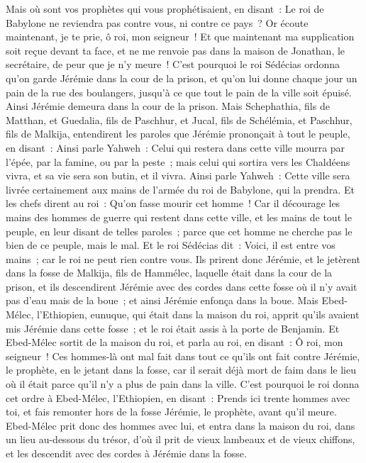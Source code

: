 \begin{multicols}{2}
Mais où sont vos prophètes qui vous prophétisaient, en disant~: Le roi de Babylone ne reviendra pas contre vous, ni contre ce pays~?
Or écoute maintenant, je te prie, ô roi, mon seigneur~! Et que maintenant ma supplication soit reçue devant ta face, et ne me renvoie pas dans la maison de Jonathan, le secrétaire, de peur que je n'y meure~!
C'est pourquoi le roi Sédécias ordonna qu'on garde Jérémie dans la cour de la prison, et qu'on lui donne chaque jour un pain de la rue des boulangers, jusqu'à ce que tout le pain de la ville soit épuisé. Ainsi Jérémie demeura dans la cour de la prison.
\VerseOne{}Mais Schephathia, fils de Matthan, et Guedalia, fils de Paschhur, et Jucal, fils de Schélémia, et Paschhur, fils de Malkija, entendirent les paroles que Jérémie prononçait à tout le peuple, en disant~:
Ainsi parle Yahweh~: Celui qui restera dans cette ville mourra par l'épée, par la famine, ou par la peste~; mais celui qui sortira vers les Chaldéens vivra, et sa vie sera son butin, et il vivra.
Ainsi parle Yahweh~: Cette ville sera livrée certainement aux mains de l'armée du roi de Babylone, qui la prendra.
Et les chefs dirent au roi~: Qu'on fasse mourir cet homme~! Car il décourage les mains des hommes de guerre qui restent dans cette ville, et les mains de tout le peuple, en leur disant de telles paroles~; parce que cet homme ne cherche pas le bien de ce peuple, mais le mal.
Et le roi Sédécias dit~: Voici, il est entre vos mains~; car le roi ne peut rien contre vous.
Ils prirent donc Jérémie, et le jetèrent dans la fosse de Malkija, fils de Hammélec, laquelle était dans la cour de la prison, et ils descendirent Jérémie avec des cordes dans cette fosse où il n'y avait pas d'eau mais de la boue~; et ainsi Jérémie enfonça dans la boue.
Mais Ebed-Mélec, l'Ethiopien, eunuque, qui était dans la maison du roi, apprit qu'ils avaient mis Jérémie dans cette fosse~; et le roi était assis à la porte de Benjamin.
Et Ebed-Mélec sortit de la maison du roi, et parla au roi, en disant~:
Ô roi, mon seigneur~! Ces hommes-là ont mal fait dans tout ce qu'ils ont fait contre Jérémie, le prophète, en le jetant dans la fosse, car il serait déjà mort de faim dans le lieu où il était parce qu'il n'y a plus de pain dans la ville.
C'est pourquoi le roi donna cet ordre à Ebed-Mélec, l'Ethiopien, en disant~: Prends ici trente hommes avec toi, et fais remonter hors de la fosse Jérémie, le prophète, avant qu'il meure.
Ebed-Mélec prit donc des hommes avec lui, et entra dans la maison du roi, dans un lieu au-dessous du trésor, d'où il prit de vieux lambeaux et de vieux chiffons, et les descendit avec des cordes à Jérémie dans la fosse.

\end{multicols}
